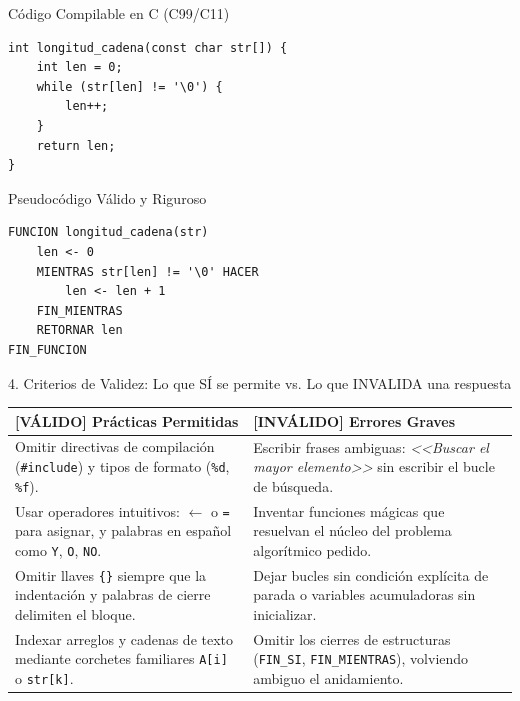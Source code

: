 \documentclass[11pt,letterpaper]{article}
\begin{document}
\begin{cbox}{Código Compilable en C (C99/C11)}
\begin{lstlisting}[style=customc]
int longitud_cadena(const char str[]) {
    int len = 0;
    while (str[len] != '\0') {
        len++;
    }
    return len;
}
\end{lstlisting}
\end{cbox}

\vspace{0.15cm}

\begin{pseudobox}{Pseudocódigo Válido y Riguroso}
\begin{lstlisting}[style=pseudocodigo]
FUNCION longitud_cadena(str)
    len <- 0
    MIENTRAS str[len] != '\0' HACER
        len <- len + 1
    FIN_MIENTRAS
    RETORNAR len
FIN_FUNCION
\end{lstlisting}
\end{pseudobox}

\vspace{0.2cm}
\begin{conceptbox}{4. Criterios de Validez: Lo que SÍ se permite vs. Lo que INVALIDA una respuesta}
\small
\begin{tabular}{p{7.3cm} p{7.3cm}}
\toprule
\textbf{\textcolor{green!50!black}{[VÁLIDO] Prácticas Permitidas}} & \textbf{\textcolor{red!70!black}{[INVÁLIDO] Errores Graves}} \\
\midrule
Omitir directivas de compilación (\texttt{\#include}) y tipos de formato (\texttt{\%d}, \texttt{\%f}). & Escribir frases ambiguas: \textit{<<Buscar el mayor elemento>>} sin escribir el bucle de búsqueda. \\
\addlinespace[2pt]
Usar operadores intuitivos: $\leftarrow$ o \texttt{=} para asignar, y palabras en español como \texttt{Y}, \texttt{O}, \texttt{NO}. & Inventar funciones mágicas que resuelvan el núcleo del problema algorítmico pedido. \\
\addlinespace[2pt]
Omitir llaves \texttt{\{\}} siempre que la indentación y palabras de cierre delimiten el bloque. & Dejar bucles sin condición explícita de parada o variables acumuladoras sin inicializar. \\
\addlinespace[2pt]
Indexar arreglos y cadenas de texto mediante corchetes familiares \texttt{A[i]} o \texttt{str[k]}. & Omitir los cierres de estructuras (\texttt{FIN\_SI}, \texttt{FIN\_MIENTRAS}), volviendo ambiguo el anidamiento. \\
\bottomrule
\end{tabular}
\end{conceptbox}
\end{document}

